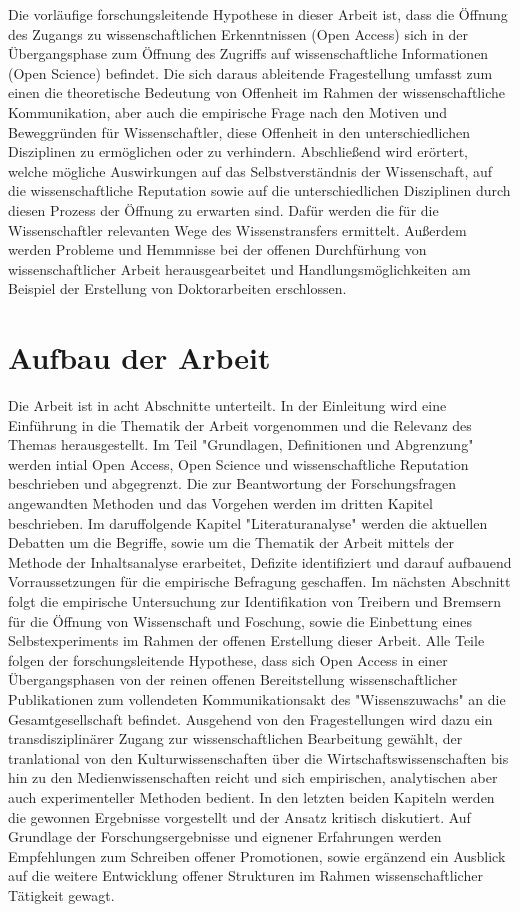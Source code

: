 Die vorläufige forschungsleitende Hypothese in dieser Arbeit ist, dass die Öffnung des Zugangs zu wissenschaftlichen Erkenntnissen (Open Access) sich in der Übergangsphase zum Öffnung des Zugriffs auf wissenschaftliche Informationen (Open Science) befindet. Die sich daraus ableitende Fragestellung umfasst zum einen die theoretische Bedeutung von Offenheit im Rahmen der wissenschaftliche Kommunikation, aber auch die empirische Frage nach den Motiven und Beweggründen für Wissenschaftler, diese Offenheit in den unterschiedlichen Disziplinen zu ermöglichen oder zu verhindern. Abschließend wird erörtert, welche mögliche Auswirkungen auf das Selbstverständnis der Wissenschaft, auf die wissenschaftliche Reputation sowie auf die unterschiedlichen Disziplinen durch diesen Prozess der Öffnung zu erwarten sind. Dafür werden die für die Wissenschaftler relevanten Wege des Wissenstransfers ermittelt. Außerdem werden Probleme und Hemmnisse bei der offenen Durchfürhung von wissenschaftlicher Arbeit herausgearbeitet und Handlungsmöglichkeiten am Beispiel der Erstellung von Doktorarbeiten erschlossen.

\section{Aufbau der Arbeit} 

Die Arbeit ist in acht Abschnitte unterteilt. In der Einleitung wird eine Einführung in die Thematik der Arbeit vorgenommen und die Relevanz des Themas herausgestellt. Im Teil "Grundlagen, Definitionen und Abgrenzung" werden intial Open Access, Open Science und wissenschaftliche Reputation beschrieben und abgegrenzt. Die zur Beantwortung der Forschungsfragen angewandten Methoden und das Vorgehen werden im dritten Kapitel beschrieben. Im daruffolgende Kapitel "Literaturanalyse" werden die aktuellen Debatten um die Begriffe, sowie um die Thematik der Arbeit mittels der Methode der Inhaltsanalyse erarbeitet, Defizite identifiziert und darauf aufbauend Vorraussetzungen für die empirische Befragung geschaffen. Im nächsten Abschnitt folgt die empirische Untersuchung zur Identifikation von Treibern und Bremsern für die Öffnung von Wissenschaft und Foschung, sowie die Einbettung eines Selbstexperiments im Rahmen der offenen Erstellung dieser Arbeit. Alle Teile folgen der forschungsleitende Hypothese, dass sich Open Access in einer Übergangsphasen von der reinen offenen Bereitstellung wissenschaftlicher Publikationen zum vollendeten Kommunikationsakt des "Wissenszuwachs" \cite{Luhmann1998} an die Gesamtgesellschaft befindet. Ausgehend von den Fragestellungen wird dazu ein transdisziplinärer Zugang zur wissenschaftlichen Bearbeitung gewählt, der tranlational von den Kulturwissenschaften über die Wirtschaftswissenschaften bis hin zu den Medienwissenschaften reicht und sich empirischen, analytischen aber auch experimenteller Methoden bedient. In den letzten beiden Kapiteln werden die gewonnen Ergebnisse vorgestellt und der Ansatz kritisch diskutiert. Auf Grundlage der Forschungsergebnisse und eignener Erfahrungen werden Empfehlungen zum Schreiben offener Promotionen, sowie ergänzend ein Ausblick auf die weitere Entwicklung offener Strukturen im Rahmen wissenschaftlicher Tätigkeit gewagt.
